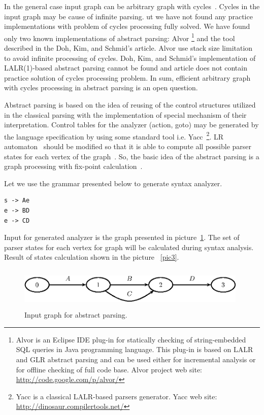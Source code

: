 \documentclass{llncs}
\begin{document}
In the general case input graph can be arbitrary graph with cycles~\cite{AbstrParsing}. Cycles in the input graph may be cause of infinite parsing. ut we have not found any practice implementations with problem of cycles processing fully solved. We have found only two known implementations of abstract parsing: Alvor
\footnote{Alvor is an Eclipse IDE plug-in for statically checking of string-embedded SQL queries in Java programming language. This plug-in is based on LALR and GLR abstract parsing and can be used either for incremental analysis or for offline checking of full code base. Alvor project web site: \href{http://code.google.com/p/alvor/}{http://code.google.com/p/alvor/}}
 and the tool described in the Doh, Kim, and Schmid's article. Alvor use stack size limitation to avoid infinite processing of cycles. Doh, Kim, and Schmid's implementation of LALR(1)-based abstract parsing cannot be found and article does not contain practice solution of cycles processing problem. In sum, efficient arbitrary graph with cycles processing in abstract parsing is an open question.
	
Abstract parsing is based on the idea of reusing of the control structures utilized in the classical parsing with the implementation of special mechanism of their interpretation. Control tables for the analyzer (action, goto) may be generated by the language specification by using some standard tool i.e. Yacc~\footnote{Yacc is a classical LALR-based parsers generator. Yacc web site: \href{http://dinosaur.compilertools.net/}{http://dinosaur.compilertools.net/}}. LR automaton~\cite{Grune} should be modified so that it is able to compute all possible parser states for each vertex of the graph~\cite{AbstrParsing}. So, the basic idea of the abstract parsing is a graph processing with fix-point calculation~\cite{ALVOR2}.

Let we use the grammar presented below to generate syntax analyzer.

\begin{verbatim}
s -> Ae
e -> BD
e -> CD
\end{verbatim}

Input for generated analyzer is the graph presented in picture~\ref{pic2}. The set of parser states for each vertex for graph will be calculated during syntax analysis. Result of states calculation shown in the picture ~\ref{pic3}.

\begin{figure}
    \begin{center}
        \includegraphics[width=11cm,height=2cm]{graphs/simple_grammar_inpt.eps}
        \caption{Input graph for abstract parsing.}
        \label{pic2}
    \end{center}
\end{figure}
\end{document}

